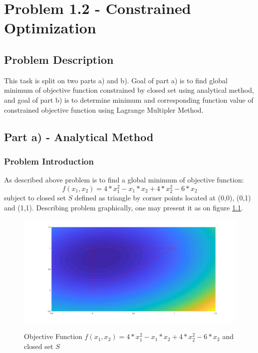 \documentclass[main.tex]{subfiles}
\begin{document}
\chapter{Problem 1.2 - Constrained Optimization}

\section{Problem Description}

This task is split on two parts a) and b). Goal of part a) is to find global minimum of objective function constrained by closed set using analytical method, and goal of part b) is to determine minimum and corresponding function value of constrained objective function using Lagrange Multipler Method.


\newpage
\section{Part a) - Analytical Method}

\subsection{Problem Introduction}
As described above problem is to find a global minimum of objective function:
\begin{equation}
    f(x_1,x_2)=4*x_1^2-x_1*x_2+4*x_2^2-6*x_2
\end{equation}
subject to closed set $S$ defined as triangle by corner points located at (0,0), (0,1) and (1,1). Describing problem graphically, one may present it as on figure \ref{fig:analyticalProblem}.

\begin{figure}[h]
\label{fig:solution}
\centering
\includegraphics[width=\textwidth]{AnalyticalMethod/ObjectiveFunctionAndClosedSet.jpg}
\label{fig:analyticalProblem}
\caption{Objective Function $f(x_1,x_2)=4*x_1^2-x_1*x_2+4*x_2^2-6*x_2$ and closed set $S$}
\end{figure}
\end{document}
